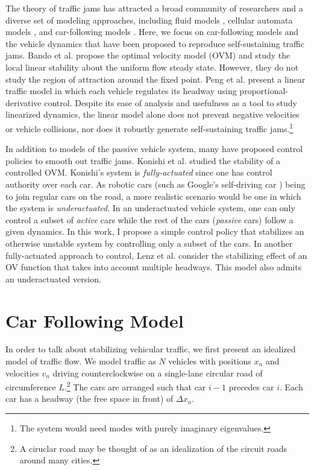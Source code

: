 \documentclass[10pt,twocolumn]{article}
\begin{document}
The theory of traffic jams has attracted a broad community of researchers and a diverse set of modeling approaches, including fluid models \cite{}, cellular automata models \cite{}, and car-following models \cite{}. Here, we focus on car-following models and the vehicle dynamics that have been proposed to reproduce self-sustaining traffic jams. Bando et al. \cite{Bando} propose the optimal velocity model (OVM) and study the local linear stability about the uniform flow steady state. However, they do not study the region of attraction around the fixed point. Peng et al. \cite{Peng} present a linear traffic model in which each vehicle regulates its headway using proportional-derivative control. Despite its ease of analysis and usefulness as a tool to study linearized dynamics, the linear model alone does not prevent negative velocities or vehicle collisions, nor does it robustly generate self-sustaining traffic jams.\footnote{The system would need modes with purely imaginary eigenvalues.}

In addition to models of the passive vehicle system, many have proposed control policies to smooth out traffic jams. Konishi et al. \cite{Konishi} studied the stability of a controlled OVM. Konishi's system is {\em fully-actuated} since one has control authority over each car. As robotic cars (such as Google's self-driving car \cite{Thrun}) being to join regular cars on the road, a more realistic scenario would be one in which the system is {\em underactuated}. In an underactuated vehicle system, one can only control a subset of {\em active} cars while the rest of the cars ({\em passive} cars) follow a given dynamics. In this work, I propose a simple control policy that stabilizes an otherwise unstable system by controlling only a subset of the cars. In another fully-actuated approach to control, Lenz et al. \cite{} consider the stabilizing effect of an OV function that takes into account multiple headways. This model also admits an underactuated version. %

\section{Car Following Model}
In order to talk about stabilizing vehicular traffic, we first present an idealized model of traffic flow. We model traffic as $N$ vehicles with positions $x_n$ and velocities $v_n$ driving counterclockwise on a single-lane circular road of circumference $L$.\footnote{A ciruclar road may be thought of as an idealization of the circuit roads around many cities.} The cars are arranged such that car $i-1$ precedes car $i$. Each car has a headway (the free space in front) of $\Delta x_n$.
\end{document}
